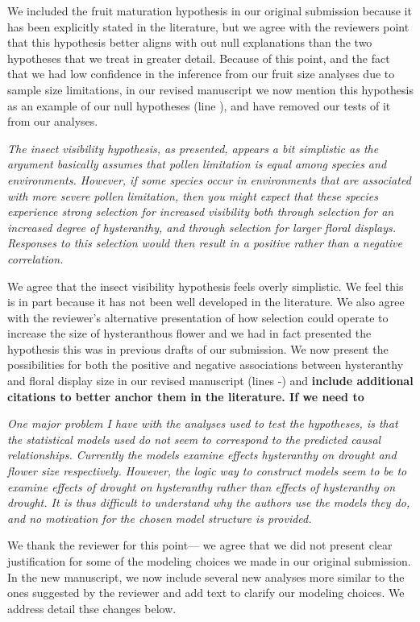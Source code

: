 \documentclass{article}[12pt]
\begin{document}
We included the fruit maturation hypothesis in our original submission because it has been explicitly stated in the literature, but we agree with the reviewers point that this hypothesis better aligns with out null explanations than the two hypotheses that we treat in greater detail. Because of this point, and the fact that we had low confidence in the inference from our fruit size analyses due to sample size limitations, in our revised manuscript we now mention this hypothesis as an example of our null hypotheses (line ), and have removed our tests of it from our analyses.

\emph{The insect visibility hypothesis, as presented, appears a bit simplistic as the argument basically assumes that pollen limitation is equal among species and environments. However, if some species occur in environments that are associated with more severe pollen limitation, then you might expect that these species experience strong selection for increased visibility both through selection for an increased degree of hysteranthy, and through selection for larger floral displays. Responses to this selection would then result in a positive rather than a negative correlation.}

We agree that the insect visibility hypothesis feels overly simplistic. We feel this is in part because it has not been well developed in the literature. We also agree with the reviewer's alternative presentation of how selection could operate to increase the size of hysteranthous flower and we had in fact presented the hypothesis this was in previous drafts of our submission. We now present the possibilities for both the positive and negative associations between hysteranthy and floral display size in our revised manuscript (lines -) and \textbf{include additional citations to better anchor them in the literature. If we need to} 

\emph{One major problem I have with the analyses used to test the hypotheses, is that the statistical models used do not seem to correspond to the predicted causal relationships. Currently the models examine effects hysteranthy on drought and flower size respectively. However, the logic way to construct models seem to be to examine effects of drought on hysteranthy rather than effects of hysteranthy on drought. It is thus difficult to understand why the authors use the models they do, and no motivation for the chosen model structure is provided.}

We thank the reviewer for this point--- we agree that we did not present clear justification for some of the modeling choices we made in our original submission. In the new manuscript, we now include several new analyses more similar to the ones suggested by the reviewer and add text to clarify our modeling choices. We address detail thse changes below.
\end{document}
